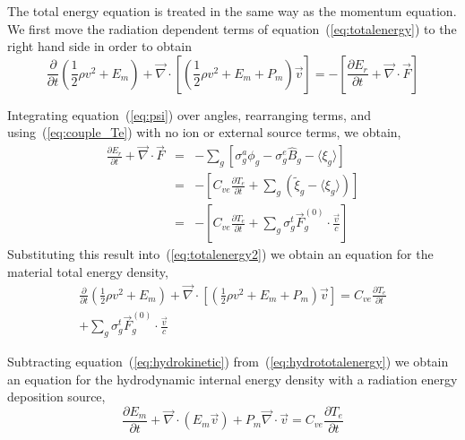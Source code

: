 \documentclass{article}
\newcommand{\partl}[2]{\ensuremath{\frac{\partial{#1}}{\partial{#2}}}}\newcommand{\del}{\ensuremath{\vec{\nabla}}}
\newcommand{\Bg}{\ensuremath{\hat{B}_{g}}}
\begin{document}
The total energy equation is treated in the same way as the
momentum equation.
We first move the radiation dependent terms of equation~(\ref{eq:totalenergy})
to the right hand side in order to obtain
\begin{equation}
        \partl{}{t}\left( \frac{1}{2} \rho v^2
                          + E_{m}\right)
         + \del \cdot \left[
              \left( \frac{1}{2} \rho v^2 + E_{m} + P_{m} \right) \vec{v}
                      \right]
    =
        - \left[ \partl{E_{r}}{t} + \del \cdot \vec{F} \right]
\label{eq:totalenergy2}
\end{equation}

Integrating equation~(\ref{eq:psi}) over angles, rearranging terms,
and using~(\ref{eq:couple_Te}) with no ion or external source terms,
we obtain,
\begin{eqnarray}
   \partl{E_{r}}{t} + \del \cdot \vec{F}
  &=&
    - \sum_{g} \left[ \sigma^{a}_{g} \phi_{g} - \sigma^{e}_{g} \Bg
    - \langle \xi_{g} \rangle \right]
  \\
  &=& 
    - \left[ C_{ve} \partl{T_{e}}{t} + \sum_{g} \left( \tilde{\xi}_{g} 
             - \langle \xi_{g} \rangle \right) \right]
  \\
  &=& 
    - \left[ C_{ve} \partl{T_{e}}{t}
             + \sum_{g} \sigma^{t}_{g} \vec{F}^{(0)}_{g} \cdot \frac{\vec{v}}{c}
      \right]
\end{eqnarray}
Substituting this result into~(\ref{eq:totalenergy2}) we obtain an equation
for the material total energy density,
\begin{multline}
        \partl{}{t}\left( \frac{1}{2} \rho v^2
                          + E_{m}\right)
         + \del \cdot \left[
              \left( \frac{1}{2} \rho v^2 + E_{m} + P_{m} \right) \vec{v}
                      \right]
    =
         C_{ve} \partl{T_{e}}{t}
     \\
            + \sum_{g} \sigma^{t}_{g} \vec{F}^{(0)}_{g} \cdot \frac{\vec{v}}{c} 
\label{eq:hydrototalenergy}
\end{multline}

Subtracting equation~(\ref{eq:hydrokinetic}) from~(\ref{eq:hydrototalenergy})
we obtain an equation for the hydrodynamic internal energy density with
a radiation energy deposition source,
\begin{equation}
  \boxed{
        \partl{E_{m}}{t}
         + \del \cdot \left( E_{m} \vec{v} \right) 
         + P_{m} \del \cdot \vec{v}
    =
         C_{ve} \partl{T_{e}}{t}
  }
\label{eq:hydrointernalenergy}
\end{equation}
\end{document}
